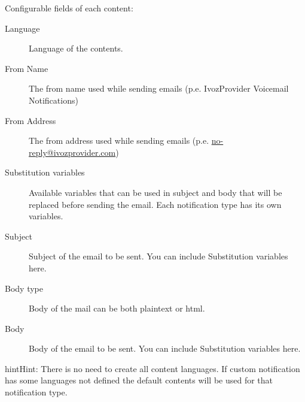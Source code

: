 \documentclass[letterpaper,10pt,english]{sphinxmanual}
\begin{document}
Configurable fields of each content:
\begin{description}
\item[{Language}] \leavevmode{}\label{administration_portal/brand/settings/notification_templates:term-language}
Language of the contents.

\item[{From Name}] \leavevmode{}\label{administration_portal/brand/settings/notification_templates:term-from-name}
The from name used while sending emails (p.e. IvozProvider Voicemail Notifications)

\item[{From Address}] \leavevmode{}\label{administration_portal/brand/settings/notification_templates:term-from-address}
The from address used while sending emails (p.e. \href{mailto:no-reply@ivozprovider.com}{no-reply@ivozprovider.com})

\item[{Substitution variables}] \leavevmode{}\label{administration_portal/brand/settings/notification_templates:term-substitution-variables}
Available variables that can be used in subject and body that will be replaced before sending the email. Each
notification type has its own variables.

\item[{Subject}] \leavevmode{}\label{administration_portal/brand/settings/notification_templates:term-subject}
Subject of the email to be sent. You can include Substitution variables here.

\item[{Body type}] \leavevmode{}\label{administration_portal/brand/settings/notification_templates:term-body-type}
Body of the mail can be both plaintext or html.

\item[{Body}] \leavevmode{}\label{administration_portal/brand/settings/notification_templates:term-body}
Body of the email to be sent. You can include Substitution variables here.

\end{description}

\begin{notice}{hint}{Hint:}
There is no need to create all content languages. If custom notification has some languages not defined the
default contents will be used for that notification type.
\end{notice}
\end{document}
